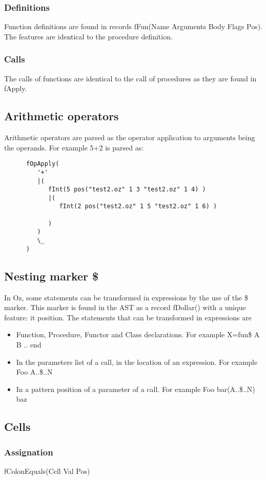 \documentclass[a4paper]{memoir}
\begin{document}
\subsubsection{Definitions}
Function definitions are found in records fFun(Name Arguments Body Flags Pos). The features are identical to the procedure definition.
\subsubsection{Calls}
The calls of functions are identical to the call of procedures as they are found in fApply.
\subsection{Arithmetic operators}
Arithmetic operators are parsed as the operator application to arguments being the operands. For example
5+2 is parsed as:
\begin{lstlisting}
      fOpApply(
         '+'
         |(
            fInt(5 pos("test2.oz" 1 3 "test2.oz" 1 4) )
            |(
               fInt(2 pos("test2.oz" 1 5 "test2.oz" 1 6) )
               
            )
         )
         \_
      )

\end{lstlisting}
\subsection{Nesting marker \$}
In Oz, some statements can be transformed in expressions by the use of the \$ marker. This marker is found in the AST as a record fDollar() with a unique feature: it position.
The statements that can be transformed in expressions are
\begin{itemize}
  \item Function, Procedure, Functor and Class declarations. For example X=fun{\$ A B} .. end
  \item In the parameters list of a call, in the location of an expression. For example {Foo A..\$..N}
  \item In a pattern position of a parameter of a call. For example {Foo bar(A..\$..N) baz}
\end{itemize}

\subsection{Cells}
\subsubsection{Assignation}
fColonEquals(Cell Val Pos) %
\end{document}

